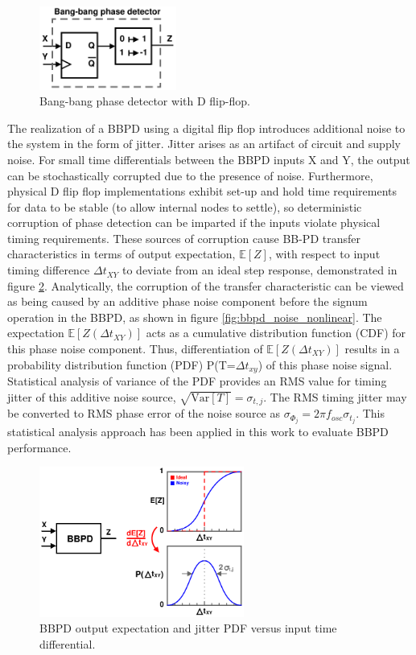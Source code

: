		\begin{figure}[htb!]
			\center\includegraphics[width=0.4\textwidth, angle=0]{./figs/design/bbpd_}
			\caption{Bang-bang phase detector with D flip-flop.}
			\label{fig:bbpd_dff}
		\end{figure}
		The realization of a BBPD using a digital flip flop introduces additional noise to the system in the form of jitter. Jitter arises as an artifact of circuit and supply noise. For small time differentials between the BBPD inputs X and Y, the output can be stochastically corrupted due to the presence of noise. Furthermore, physical D flip flop implementations exhibit set-up and hold time requirements for data to be stable (to allow internal nodes to settle), so deterministic corruption of phase detection can be imparted if the inputs violate physical timing requirements. These sources of corruption cause BB-PD transfer characteristics in terms of output expectation, $\mathbb{E}[Z]$, with respect to input timing difference $\Delta t_{XY}$ to deviate from an ideal step response, demonstrated in figure \ref{fig:bbpd_jit_pdf}. Analytically, the corruption of the transfer characteristic can be viewed as being caused by an additive phase noise component before the signum operation in the BBPD, as shown in figure \ref{fig:bbpd_noise_nonlinear}. The expectation $\mathbb{E}[Z(\Delta t_{XY})]$ acts as a cumulative distribution function (CDF) for this phase noise component. Thus, differentiation of $\mathbb{E}[Z(\Delta t_{XY})]$ results in a probability distribution function (PDF) P(T=$\Delta t_{xy}$) of this phase noise signal. Statistical analysis of variance of the PDF provides an RMS value for timing jitter of this additive noise source, $\sqrt{\mathrm{Var}[T]} = \sigma_{t,j}$. The RMS timing jitter may be converted to RMS phase error of the noise source as $\sigma_{\Phi_j} = 2\pi f_{osc}\sigma_{t_j}$. This statistical analysis approach has been applied in this work to evaluate BBPD performance.
 
		\begin{figure}[htb!]
		    \centering
			\includegraphics[width=0.6\textwidth, angle=0]{./figs/bbpd_jitter.pdf}
			\caption{BBPD output expectation and jitter PDF versus input time differential.}
			\label{fig:bbpd_jit_pdf}
		\end{figure}

